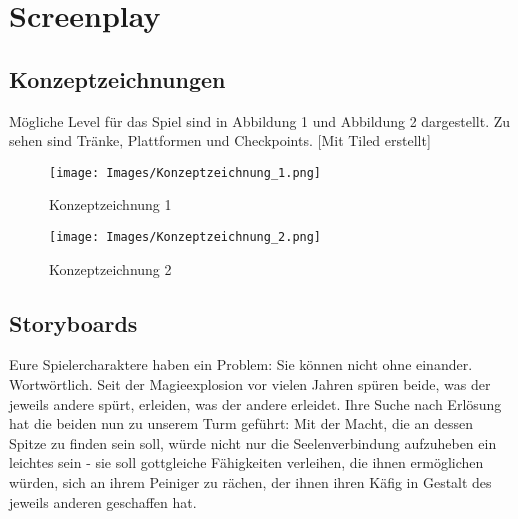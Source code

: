 \documentclass[11pt]{article}
\begin{document}
\section{Screenplay}
\subsection{Konzeptzeichnungen}
Mögliche Level für das Spiel sind in Abbildung 1 und Abbildung 2 dargestellt. Zu sehen sind Tränke, Plattformen und Checkpoints. [Mit Tiled erstellt]
\begin{figure}[htbp]
    \centering
    \texttt{[image: Images/Konzeptzeichnung\_1.png]}
    \caption{Konzeptzeichnung 1}
\end{figure}

\begin{figure}[htbp]
    \centering
    \texttt{[image: Images/Konzeptzeichnung\_2.png]}
    \caption{Konzeptzeichnung 2}
\end{figure}
\newpage
\subsection{Storyboards}
Eure Spielercharaktere haben ein Problem: Sie können nicht ohne einander. Wortwörtlich. Seit der Magieexplosion vor vielen Jahren spüren beide, was der jeweils andere spürt, erleiden, was der andere erleidet. Ihre Suche nach Erlösung hat die beiden nun zu unserem Turm geführt: Mit der Macht, die an dessen Spitze zu finden sein soll, würde nicht nur die Seelenverbindung aufzuheben ein leichtes sein - sie soll gottgleiche Fähigkeiten verleihen, die ihnen ermöglichen würden, sich an ihrem Peiniger zu rächen, der ihnen ihren Käfig in Gestalt des jeweils anderen geschaffen hat.
\newpage
\end{document}
